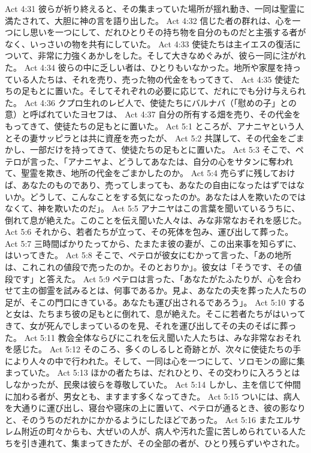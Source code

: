Act 4:31  彼らが祈り終えると、その集まっていた場所が揺れ動き、一同は聖霊に満たされて、大胆に神の言を語り出した。
Act 4:32  信じた者の群れは、心を一つにし思いを一つにして、だれひとりその持ち物を自分のものだと主張する者がなく、いっさいの物を共有にしていた。
Act 4:33  使徒たちは主イエスの復活について、非常に力強くあかしをした。そして大きなめぐみが、彼ら一同に注がれた。
Act 4:34  彼らの中に乏しい者は、ひとりもいなかった。地所や家屋を持っている人たちは、それを売り、売った物の代金をもってきて、
Act 4:35  使徒たちの足もとに置いた。そしてそれぞれの必要に応じて、だれにでも分け与えられた。
Act 4:36  クプロ生れのレビ人で、使徒たちにバルナバ（「慰めの子」との意）と呼ばれていたヨセフは、
Act 4:37  自分の所有する畑を売り、その代金をもってきて、使徒たちの足もとに置いた。
Act 5:1  ところが、アナニヤという人とその妻サッピラとは共に資産を売ったが、
Act 5:2  共謀して、その代金をごまかし、一部だけを持ってきて、使徒たちの足もとに置いた。
Act 5:3  そこで、ペテロが言った、「アナニヤよ、どうしてあなたは、自分の心をサタンに奪われて、聖霊を欺き、地所の代金をごまかしたのか。
Act 5:4  売らずに残しておけば、あなたのものであり、売ってしまっても、あなたの自由になったはずではないか。どうして、こんなことをする気になったのか。あなたは人を欺いたのではなくて、神を欺いたのだ」。
Act 5:5  アナニヤはこの言葉を聞いているうちに、倒れて息が絶えた。このことを伝え聞いた人々は、みな非常なおそれを感じた。
Act 5:6  それから、若者たちが立って、その死体を包み、運び出して葬った。
Act 5:7  三時間ばかりたってから、たまたま彼の妻が、この出来事を知らずに、はいってきた。
Act 5:8  そこで、ペテロが彼女にむかって言った、「あの地所は、これこれの値段で売ったのか。そのとおりか」。彼女は「そうです、その値段です」と答えた。
Act 5:9  ペテロは言った、「あなたがたふたりが、心を合わせて主の御霊を試みるとは、何事であるか。見よ、あなたの夫を葬った人たちの足が、そこの門口にきている。あなたも運び出されるであろう」。
Act 5:10  すると女は、たちまち彼の足もとに倒れて、息が絶えた。そこに若者たちがはいってきて、女が死んでしまっているのを見、それを運び出してその夫のそばに葬った。
Act 5:11  教会全体ならびにこれを伝え聞いた人たちは、みな非常なおそれを感じた。
Act 5:12  そのころ、多くのしるしと奇跡とが、次々に使徒たちの手により人々の中で行われた。そして、一同は心を一つにして、ソロモンの廊に集まっていた。
Act 5:13  ほかの者たちは、だれひとり、その交わりに入ろうとはしなかったが、民衆は彼らを尊敬していた。
Act 5:14  しかし、主を信じて仲間に加わる者が、男女とも、ますます多くなってきた。
Act 5:15  ついには、病人を大通りに運び出し、寝台や寝床の上に置いて、ペテロが通るとき、彼の影なりと、そのうちのだれかにかかるようにしたほどであった。
Act 5:16  またエルサレム附近の町々からも、大ぜいの人が、病人や汚れた霊に苦しめられている人たちを引き連れて、集まってきたが、その全部の者が、ひとり残らずいやされた。
